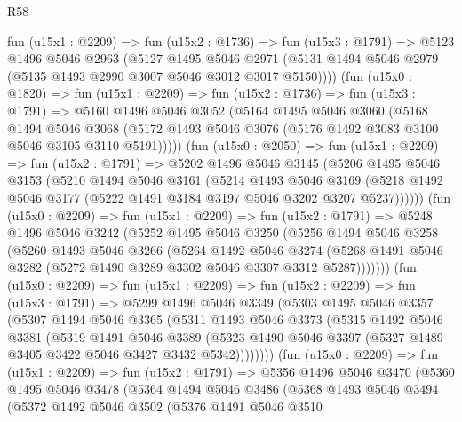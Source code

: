 \begin{lexlean}{R58}
\begin{coremodule}
    fun (u15x1 : @2209) =>
    fun (u15x2 : @1736) =>
    fun (u15x3 : @1791) =>
    @5123
      @1496
      @5046
      @2963
      (@5127
        @1495
        @5046
        @2971
        (@5131 @1494 @5046 @2979 (@5135 @1493 @2990 @3007 @5046 @3012 @3017 @5150))))
    (fun (u15x0 : @1820) =>
    fun (u15x1 : @2209) =>
    fun (u15x2 : @1736) =>
    fun (u15x3 : @1791) =>
    @5160
      @1496
      @5046
      @3052
      (@5164
        @1495
        @5046
        @3060
        (@5168
          @1494
          @5046
          @3068
          (@5172 @1493 @5046 @3076 (@5176 @1492 @3083 @3100 @5046 @3105 @3110 @5191)))))
    (fun (u15x0 : @2050) =>
    fun (u15x1 : @2209) =>
    fun (u15x2 : @1791) =>
    @5202
      @1496
      @5046
      @3145
      (@5206
        @1495
        @5046
        @3153
        (@5210
          @1494
          @5046
          @3161
          (@5214
            @1493
            @5046
            @3169
            (@5218 @1492 @5046 @3177 (@5222 @1491 @3184 @3197 @5046 @3202 @3207 @5237))))))
    (fun (u15x0 : @2209) =>
    fun (u15x1 : @2209) =>
    fun (u15x2 : @1791) =>
    @5248
      @1496
      @5046
      @3242
      (@5252
        @1495
        @5046
        @3250
        (@5256
          @1494
          @5046
          @3258
          (@5260
            @1493
            @5046
            @3266
            (@5264
              @1492
              @5046
              @3274
              (@5268 @1491 @5046 @3282 (@5272 @1490 @3289 @3302 @5046 @3307 @3312 @5287)))))))
    (fun (u15x0 : @2209) =>
    fun (u15x1 : @2209) =>
    fun (u15x2 : @2209) =>
    fun (u15x3 : @1791) =>
    @5299
      @1496
      @5046
      @3349
      (@5303
        @1495
        @5046
        @3357
        (@5307
          @1494
          @5046
          @3365
          (@5311
            @1493
            @5046
            @3373
            (@5315
              @1492
              @5046
              @3381
              (@5319
                @1491
                @5046
                @3389
                (@5323 @1490 @5046 @3397 (@5327 @1489 @3405 @3422 @5046 @3427 @3432 @5342))))))))
    (fun (u15x0 : @2209) =>
    fun (u15x1 : @2209) =>
    fun (u15x2 : @1791) =>
    @5356
      @1496
      @5046
      @3470
      (@5360
        @1495
        @5046
        @3478
        (@5364
          @1494
          @5046
          @3486
          (@5368
            @1493
            @5046
            @3494
            (@5372
              @1492
              @5046
              @3502
              (@5376
                @1491
                @5046
                @3510

\end{coremodule}
\end{lexlean}
